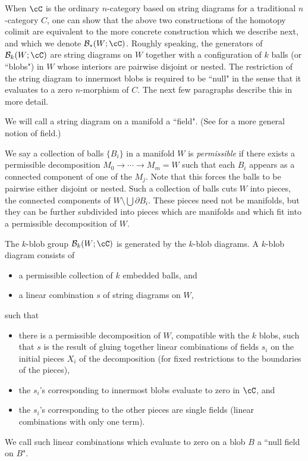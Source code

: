 \documentclass{pnastwo}
\def\bc{{\mathcal B}}
\newcommand{\bdy}{\partial}
\newcommand{\todo}[1]{\textbf{\color[rgb]{.8,.2,.5}\small TODO: #1}}
\begin{document}
\begin{article}
When $\cC$ is the ordinary $n$-category based on string diagrams for a traditional
$n$-category $C$,
one can show \cite{1009.5025} that the above two constructions of the homotopy colimit
are equivalent to the more concrete construction which we describe next, and which we denote $\bc_*(W; \cC)$.
Roughly speaking, the generators of $\bc_k(W; \cC)$ are string diagrams on $W$ together with
a configuration of $k$ balls (or ``blobs") in $W$ whose interiors are pairwise disjoint or nested.
The restriction of the string diagram to innermost blobs is required to be ``null" in the sense that
it evaluates to a zero $n$-morphism of $C$.
The next few paragraphs describe this in more detail.

We will call a string diagram on a manifold a ``field".
(See \cite{1009.5025} for a more general notion of field.)

We say a collection of balls $\{B_i\}$ in a manifold $W$ is \emph{permissible}
if there exists a permissible decomposition $M_0\to\cdots\to M_m = W$ such that
each $B_i$ appears as a connected component of one of the $M_j$. 
Note that this forces the balls to be pairwise either disjoint or nested. 
Such a collection of balls cuts $W$ into pieces, the connected components of $W \setminus \bigcup \bdy B_i$. 
These pieces need not be manifolds, 
but they can be further subdivided into pieces which are manifolds
and which fit into a permissible decomposition of $W$.

The $k$-blob group $\bc_k(W; \cC)$ is generated by the $k$-blob diagrams. 
A $k$-blob diagram consists of
\begin{itemize}
	\item a permissible collection of $k$ embedded balls, and
	\item a linear combination $s$ of string diagrams on $W$,
\end{itemize}
such that
\begin{itemize}
	\item there is a permissible decomposition of $W$, compatible with the $k$ blobs, such that
	$s$ is the result of gluing together linear combinations of fields $s_i$ on the initial pieces $X_i$ of the decomposition
	(for fixed restrictions to the boundaries of the pieces),
	\item the $s_i$'s corresponding to innermost blobs evaluate to zero in $\cC$, and
	\item the $s_i$'s corresponding to the other pieces are single fields (linear combinations with only one term).
\end{itemize}
We call such linear combinations which evaluate to zero on a blob $B$ a ``null field on $B$".


\end{article}
\end{document}
